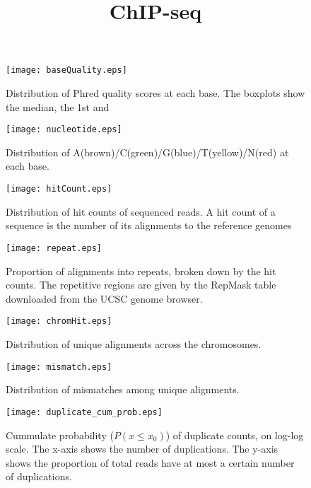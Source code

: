 \documentclass[a4paper,10pt]{article}
\title{ChIP-seq}
\begin{document}
\maketitle

\begin{figure}[!ht]
\centering
\texttt{[image: baseQuality.eps]}
\caption{\small Distribution of Phred quality scores at each base. The boxplots show the median, the 1st and }
\end{figure}


\begin{figure}[!ht]
\centering
\texttt{[image: nucleotide.eps]}
\caption{\small Distribution of A(brown)/C(green)/G(blue)/T(yellow)/N(red) at each base.}
\end{figure}

\begin{figure}[!ht]
\centering
\texttt{[image: hitCount.eps]}
\caption{\small Distribution of hit counts of sequenced reads. A hit count of a sequence is the number of its alignments to the reference genomes}
\end{figure}

\begin{figure}[!ht]
\centering
\texttt{[image: repeat.eps]}
\caption{\small Proportion of alignments into repeats, broken down by the hit counts. The repetitive regions are given by the RepMask table downloaded from the UCSC genome browser.}
\end{figure}

\begin{figure}[!ht]
\centering
\texttt{[image: chromHit.eps]}
\caption{\small Distribution of unique alignments across the chromosomes.}
\end{figure}

\begin{figure}[!ht]
\centering
\texttt{[image: mismatch.eps]}
\caption{\small Distribution of mismatches among unique alignments.}
\end{figure}

\begin{figure}[!ht]
\centering
\texttt{[image: duplicate\_cum\_prob.eps]}
\caption{\small Cummulate probability ($P(x \le x_0)$) of duplicate counts, on log-log scale. The x-axis shows the number of duplications. The y-axis shows the proportion of total reads have at most a certain number of duplications.}
\end{figure}
\end{document}
